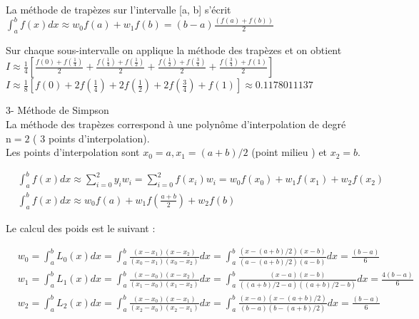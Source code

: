 \documentclass[10pt]{article}
\begin{document}
La méthode de trapèzes sur l'intervalle [a, b] s'écrit\\
\(\int_{a}^{b} f(x) d x \approx w_{0} f(a)+w_{1} f(b)=(b-a) \frac{(f(a)+f(b))}{2}\)

Sur chaque sous-intervalle on applique la méthode des trapèzes et on obtient\\
\(I \approx \frac{1}{4}\left[\frac{f(0)+f\left(\frac{1}{4}\right)}{2}+\frac{f\left(\frac{1}{4}\right)+f\left(\frac{1}{2}\right)}{2}+\frac{f\left(\frac{1}{2}\right)+f\left(\frac{3}{4}\right)}{2}+\frac{f\left(\frac{3}{4}\right)+f(1)}{2}\right]\)\\
\(I \approx \frac{1}{8}\left[f(0)+2 f\left(\frac{1}{4}\right)+2 f\left(\frac{1}{2}\right)+2 f\left(\frac{3}{4}\right)+f(1)\right] \approx 0.1178011137\)

3- Méthode de Simpson\\
La méthode des trapèzes correspond à une polynôme d'interpolation de degré \(\mathrm{n}=2\) ( 3 points d'interpolation).\\
Les points d'interpolation sont \(x_{0}=a, x_{1}=(a+b) / 2\) (point milieu ) et \(x_{2}=b\).

\[
\begin{aligned}
& \int_{a}^{b} f(x) d x \approx \sum_{i=0}^{2} y_{i} w_{i}=\sum_{i=0}^{2} f\left(x_{i}\right) w_{i}=w_{0} f\left(x_{0}\right)+w_{1} f\left(x_{1}\right)+w_{2} f\left(x_{2}\right) \\
& \int_{a}^{b} f(x) d x \approx w_{0} f(a)+w_{1} f\left(\frac{a+b}{2}\right)+w_{2} f(b)
\end{aligned}
\]

Le calcul des poids est le suivant :

\[
\begin{aligned}
& w_{0}=\int_{a}^{b} L_{0}(x) d x=\int_{a}^{b} \frac{\left(x-x_{1}\right)\left(x-x_{2}\right)}{\left(x_{0}-x_{1}\right)\left(x_{0}-x_{2}\right)} d x=\int_{a}^{b} \frac{(x-(a+b) / 2)(x-b)}{(a-(a+b) / 2)(a-b)} d x=\frac{(b-a)}{6} \\
& w_{1}=\int_{a}^{b} L_{1}(x) d x=\int_{a}^{b} \frac{\left(x-x_{0}\right)\left(x-x_{2}\right)}{\left(x_{1}-x_{0}\right)\left(x_{1}-x_{2}\right)} d x=\int_{a}^{b} \frac{(x-a)(x-b)}{((a+b) / 2-a)((a+b) / 2-b)} d x=\frac{4(b-a)}{6} \\
& w_{2}=\int_{a}^{b} L_{2}(x) d x=\int_{a}^{b} \frac{\left(x-x_{0}\right)\left(x-x_{1}\right)}{\left(x_{2}-x_{0}\right)\left(x_{2}-x_{1}\right)} d x=\int_{a}^{b} \frac{(x-a)(x-(a+b) / 2)}{(b-a)(b-(a+b) / 2)} d x=\frac{(b-a)}{6}
\end{aligned}
\]
\end{document}
